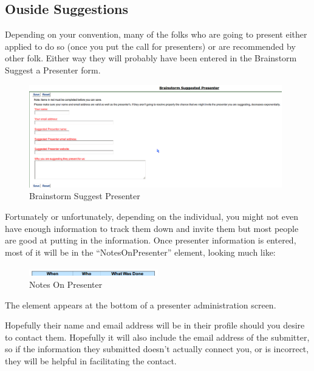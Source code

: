 \documentclass[tablesignature]{scrartcl}
\begin{document}
\subsection{Ouside Suggestions}
\label{sec-2_1}

   
   Depending on your convention, many of the folks who are going to
   present either applied to do so (once you put the call for
   presenters) or are recommended by other folk.  Either way they
   will probably have been entered in the Brainstorm Suggest a
   Presenter form.

\begin{figure}[H]
\centering
\includegraphics[width=0.98\textwidth]{./Images/Brainstorm_Suggest_Presenter.png}
\caption{\label{fig:Zambia_Presenter_Flow_Brainstorm_Suggest_Presenter}Brainstorm Suggest Presenter}
\end{figure}

   Fortunately or unfortunately, depending on the individual, you
   might not even have enough information to track them down and
   invite them but most people are good at putting in the
   information.  Once presenter information is entered, most of it
   will be in the ``NotesOnPresenter'' element, looking much like:

\begin{figure}[H]
\centering
\includegraphics[width=0.5\textwidth]{./Images/Notes_On_Participant.png}
\caption{\label{fig:Zambia_Presenter_Flow_Notes_On_Presenter}Notes On Presenter}
\end{figure}

   The element appears at the bottom of a presenter administration
   screen.

   Hopefully their name and email address will be in their profile
   should you desire to contact them.  Hopefully it will also include
   the email address of the submitter, so if the information they
   submitted doesn't actually connect you, or is incorrect, they will
   be helpful in facilitating the contact.
\end{document}
